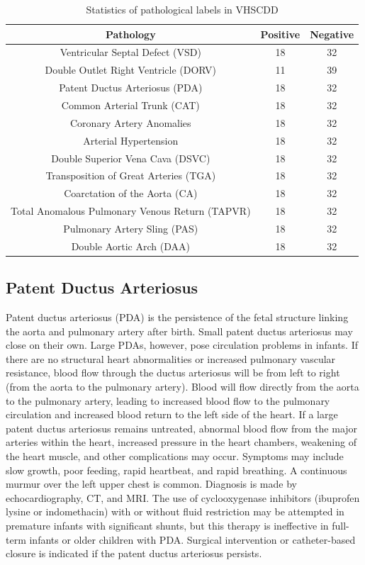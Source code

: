 \documentclass{article}
\begin{document}
\begin{table}[]
    \centering
    \begin{tabular}{c|c|c}
         \textbf{Pathology} &  \textbf{Positive} & \textbf{Negative} \\
         \midrule
         Ventricular Septal Defect (VSD) & 18  & 32 \\
         Double Outlet Right Ventricle (DORV) & 11  & 39 \\
         Patent Ductus Arteriosus (PDA) & 18  & 32 \\
         Common Arterial Trunk (CAT) & 18  & 32 \\
         Coronary Artery Anomalies & 18  & 32 \\
         Arterial Hypertension & 18  & 32 \\
         Double Superior Vena Cava (DSVC) & 18  & 32 \\
         Transposition of Great Arteries (TGA)  & 18  & 32 \\
         Coarctation of the Aorta (CA)  & 18  & 32 \\
         Total Anomalous Pulmonary Venous Return (TAPVR)  & 18  & 32 \\
         Pulmonary Artery Sling (PAS) & 18  & 32 \\  
         Double Aortic Arch (DAA) & 18  & 32 \\
    \end{tabular}
    \caption{Statistics of pathological labels in VHSCDD}
    \label{tab:2}
\end{table}

\subsection{Patent Ductus Arteriosus}
Patent ductus arteriosus (PDA) is the persistence of the fetal structure linking the aorta and pulmonary artery after birth. Small patent ductus arteriosus may close on their own. Large PDAs, however, pose circulation problems in infants. If there are no structural heart abnormalities or increased pulmonary vascular resistance, blood flow through the ductus arteriosus will be from left to right (from the aorta to the pulmonary artery). Blood will flow directly from the aorta to the pulmonary artery, leading to increased blood flow to the pulmonary circulation and increased blood return to the left side of the heart. If a large patent ductus arteriosus remains untreated, abnormal blood flow from the major arteries within the heart, increased pressure in the heart chambers, weakening of the heart muscle, and other complications may occur. Symptoms may include slow growth, poor feeding, rapid heartbeat, and rapid breathing. A continuous murmur over the left upper chest is common. Diagnosis is made by echocardiography, CT, and MRI. The use of cyclooxygenase inhibitors (ibuprofen lysine or indomethacin) with or without fluid restriction may be attempted in premature infants with significant shunts, but this therapy is ineffective in full-term infants or older children with PDA. Surgical intervention or catheter-based closure is indicated if the patent ductus arteriosus persists.
\end{document}
